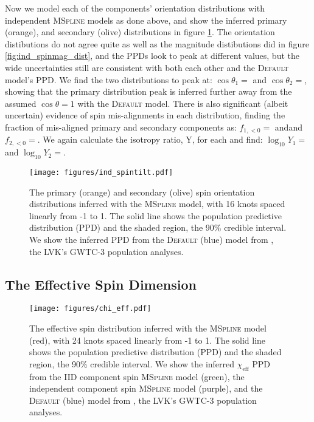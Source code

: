 Now we model each of the components' orientation distributions with independent \textsc{MSpline} models as done above, and show the inferred 
primary (orange), and secondary (olive) distributions in figure \ref{fig:ind_spintilt_dist}. The orientation distibutions do not agree quite as well as 
the magnitude distibutions did in figure \ref{fig:ind_spinmag_dist}, and the PPDs look to peak at different values, but the wide uncertainties still are 
consistent with both each other and the \textsc{Default} model's PPD. We find the two distributions to peak at: $\cos{\theta_1}=$\result{$\CIPlusMinus{\macros[MSplineIndependentCompSpins][peakCosTilt1]}$} 
and $\cos{\theta_2}=$\result{$\CIPlusMinus{\macros[MSplineIndependentCompSpins][peakCosTilt2]}$}, showing that the primary distribution peak is inferred further away 
from the assumed $\cos{\theta}=1$ with the \textsc{Default} model. There is also significant (albeit uncertain) evidence of spin mis-alignments in each distribution, finding 
the fraction of mis-aligned primary and secondary components as: $f_{1,<0}=$\result{$\CIPlusMinus{\macros[MSplineIndependentCompSpins][negFrac1]}$} andand $f_{2,<0}=$\result{$\CIPlusMinus{\macros[MSplineIndependentCompSpins][negFrac2]}$}.
We again calculate the isotropy ratio, Y, for each and find: $\log_{10}Y_1=$ and 
$\log_{10}Y_2=$.

\begin{figure}
        \texttt{[image: figures/ind\_spintilt.pdf]}
        \caption{The primary (orange) and secondary (olive) spin orientation distributions inferred with the \textsc{MSpline} model, 
        with 16 knots spaced linearly from -1 to 1. The solid line shows the population predictive distribution (PPD) and the shaded region, the 90\% credible interval. 
        We show the inferred PPD from the \textsc{Default} (blue) model from \citet{o3b_astro_dist}, the LVK's GWTC-3 population analyses.}
        \label{fig:ind_spintilt_dist}
\end{figure}

\subsection{The Effective Spin Dimension}

\begin{figure}
    \texttt{[image: figures/chi\_eff.pdf]}
    \caption{The effective spin distribution inferred with the \textsc{MSpline} model (red), with 24 knots spaced linearly from -1 to 1. 
    The solid line shows the population predictive distribution (PPD) and the shaded region, the 90\% credible interval. We show the inferred $\chi_\mathrm{eff}$ 
    PPD from the IID component spin \textsc{MSpline} model (green), the independent component spin \textsc{MSpline} model (purple), 
    and the \textsc{Default} (blue) model from \citet{o3b_astro_dist}, the LVK's GWTC-3 population analyses.}
    \label{fig:chieff_dist}
\end{figure}

